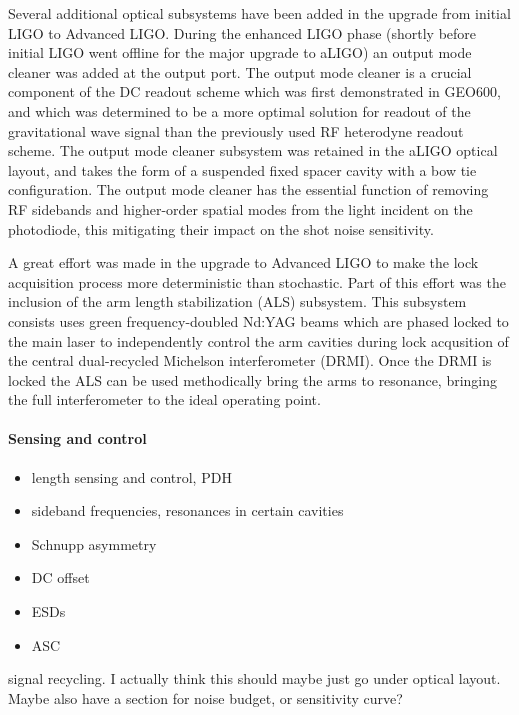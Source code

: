 Several additional optical subsystems have been added in the upgrade from initial LIGO to Advanced LIGO. 
During the enhanced LIGO phase (shortly before initial LIGO went offline for the major upgrade to aLIGO) an output
mode cleaner was added at the output port. The output mode cleaner is a crucial component of the DC readout 
scheme which was first demonstrated in GEO600, and which was determined to be a more optimal solution for 
readout of the gravitational wave signal than the previously used RF heterodyne readout scheme. The output mode 
cleaner subsystem was retained in the aLIGO optical layout, and takes the form of a suspended fixed spacer cavity 
with a bow tie configuration. The output mode cleaner has the essential function of removing RF sidebands and higher-order 
spatial modes from the light incident on the photodiode, this mitigating their impact on the shot noise sensitivity. 

A great effort was made in the upgrade to Advanced LIGO to make the lock acquisition process more deterministic than 
stochastic. Part of this effort was the inclusion of the arm length stabilization (ALS) subsystem. This subsystem consists uses 
green frequency-doubled Nd:YAG beams which are phased locked to the main laser to independently control the arm cavities during 
lock acqusition of the central dual-recycled Michelson interferometer (DRMI). Once the DRMI is locked the ALS can be used 
methodically bring the arms to resonance, bringing the full interferometer to the ideal operating point.

\paragraph*{Sensing and control}

\begin{itemize}
\item length sensing and control, PDH
\item sideband frequencies, resonances in certain cavities
\item Schnupp asymmetry
\item DC offset
\item ESDs
\item ASC
\end{itemize}

signal recycling. I actually think this should maybe just go under optical layout.
Maybe also have a section for noise budget, or sensitivity curve?








